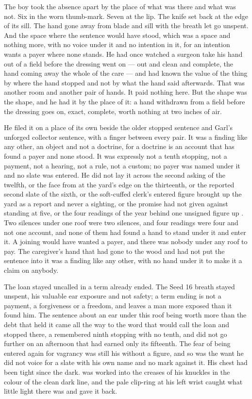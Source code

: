 The boy took the absence apart by the place of what was there and what was not. Six in the worn thumb-mark. Seven at the lip. The knife set back at the edge of its sill. The hand gone away from blade and sill with the breath let go unspent. And the space where the sentence would have stood, which was a space and nothing more, with no voice under it and no intention in it, for an intention wants a payer where none stands. He had once watched a surgeon take his hand out of a field before the dressing went on --- out and clean and complete, the hand coming away the whole of the care --- and had known the value of the thing by where the hand stopped and not by what the hand said afterwards. That was another room and another pair of hands. It paid nothing here. But the shape was the shape, and he had it by the place of it: a hand withdrawn from a field before the dressing goes on, exact, complete, worth nothing at two inches of air.

He filed it on a place of its own beside the older stopped sentence and Garl's unforged collector sentence, with a finger between every pair. It was a finding like any other, an object and not a doctrine, for a doctrine is an account that has found a payer and none stood. It was expressly not a tenth stopping, not a payment, not a hearing, not a rule, not a custom; no payer was named under it and no slate was entered. He did not lay it across the second asking of the twelfth, or the face from  at the yard's edge on the thirteenth, or the reported second slate of the sixth, or the soft-cuffed clerk's entered figure brought up the yard as a report and never a sighting, or the promise  had not given against  standing at five, or the four readings of the year behind one unsigned figure up . Two silences under one roof were two silences, and four readings were four and not one account, and none of them had found a hand to stand under it and enter it. A joining would have wanted a payer, and there was nobody under any roof to pay. The caregiver's hand that had gone to the wood and had not put the sentence into it was a finding like any other, with no hand under it to make it a claim on anybody.

The loan stayed uncalled in a term already ended. The Seed 16 breath stayed unspent, his valuable ear exposure and not safety; a term ending is not a payment, a forgiveness or a freedom, and leaves a man more exposed than it found him. The sentence about an ear under this roof being worth more than the debt that held it came all the way to the word that would call the loan and stopped there, a remembered ninth stopping with no tenth, and did not go further on an afternoon that had earned only its fifteenth. The fear of being entered again for vagrancy was still his without a figure, and so was the want he did not voice for a slate with his own name and no mark against it. His chest had been tight since the dark.  was worked into the creases of his knuckles in the colour of the clean dark line, and the pale clip-ring at his left wrist caught what little light there was and gave it back.

